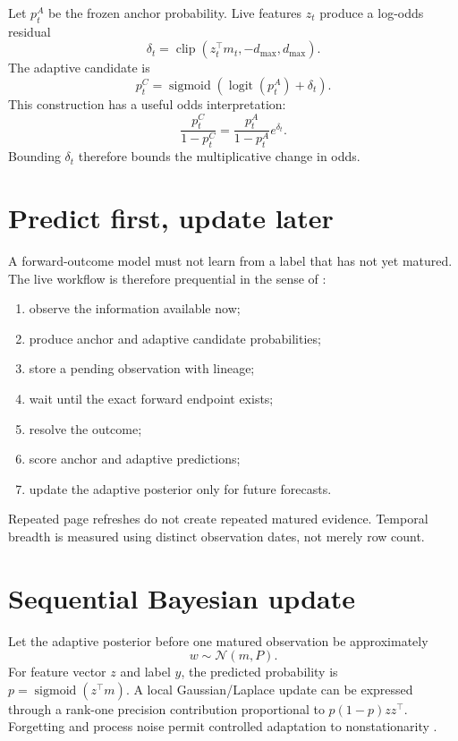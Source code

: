 \documentclass[11pt]{article}
\newcommand{\sigmoid}{\operatorname{sigmoid}}
\newcommand{\logit}{\operatorname{logit}}
\begin{document}
Let $p_t^A$ be the frozen anchor probability. Live features $z_t$ produce a log-odds residual
\begin{equation}
\delta_t=\operatorname{clip}(z_t^\top m_t,-d_{\max},d_{\max}).
\end{equation}
The adaptive candidate is
\begin{equation}
p_t^C=\sigmoid\left(\logit(p_t^A)+\delta_t\right).
\end{equation}
This construction has a useful odds interpretation:
\begin{equation}
\frac{p_t^C}{1-p_t^C}=\frac{p_t^A}{1-p_t^A}e^{\delta_t}.
\end{equation}
Bounding $\delta_t$ therefore bounds the multiplicative change in odds.

\section{Predict first, update later}

A forward-outcome model must not learn from a label that has not yet matured. The live workflow is therefore prequential in the sense of \citet{dawid1984prequential}:

\begin{enumerate}
\item observe the information available now;
\item produce anchor and adaptive candidate probabilities;
\item store a pending observation with lineage;
\item wait until the exact forward endpoint exists;
\item resolve the outcome;
\item score anchor and adaptive predictions;
\item update the adaptive posterior only for future forecasts.
\end{enumerate}

Repeated page refreshes do not create repeated matured evidence. Temporal breadth is measured using distinct observation dates, not merely row count.

\section{Sequential Bayesian update}

Let the adaptive posterior before one matured observation be approximately
\begin{equation}
w\sim\mathcal N(m,P).
\end{equation}
For feature vector $z$ and label $y$, the predicted probability is $p=\sigmoid(z^\top m)$. A local Gaussian/Laplace update can be expressed through a rank-one precision contribution proportional to $p(1-p)zz^\top$. Forgetting and process noise permit controlled adaptation to nonstationarity \citep{mccormick2012dynamic,penny1999dynamic}.
\end{document}
